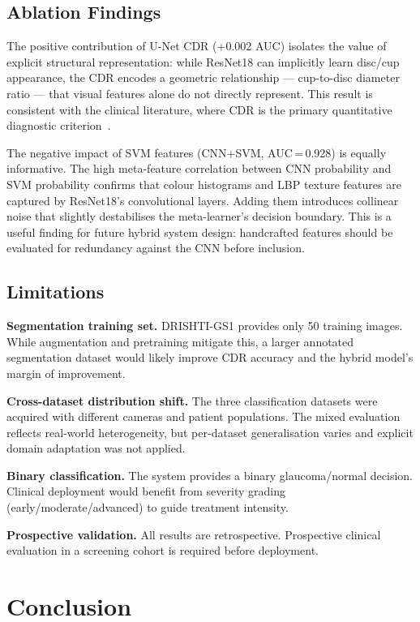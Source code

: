 \documentclass[conference]{IEEEtran}
\begin{document}
\subsection{Ablation Findings}
The positive contribution of U-Net CDR (+0.002 AUC) isolates the
value of explicit structural representation: while ResNet18 can
implicitly learn disc/cup appearance, the CDR encodes a geometric
relationship — cup-to-disc diameter ratio — that visual features
alone do not directly represent. This result is consistent with the
clinical literature, where CDR is the primary quantitative
diagnostic criterion~\cite{jonas1988}.
 
The negative impact of SVM features (CNN+SVM, AUC\,=\,0.928) is
equally informative. The high meta-feature correlation between CNN
probability and SVM probability confirms that colour histograms and
LBP texture features are captured by ResNet18's convolutional
layers. Adding them introduces collinear noise that slightly
destabilises the meta-learner's decision boundary. This is a useful
finding for future hybrid system design: handcrafted features should
be evaluated for redundancy against the CNN before inclusion.
 
\subsection{Limitations}
\textbf{Segmentation training set.} DRISHTI-GS1 provides only 50
training images. While augmentation and pretraining mitigate this,
a larger annotated segmentation dataset would likely improve CDR
accuracy and the hybrid model's margin of improvement.
 
\textbf{Cross-dataset distribution shift.} The three classification
datasets were acquired with different cameras and patient populations.
The mixed evaluation reflects real-world heterogeneity, but per-dataset
generalisation varies and explicit domain adaptation was not applied.
 
\textbf{Binary classification.} The system provides a binary
glaucoma/normal decision. Clinical deployment would benefit from
severity grading (early/moderate/advanced) to guide treatment
intensity.
 
\textbf{Prospective validation.} All results are retrospective.
Prospective clinical evaluation in a screening cohort is required
before deployment.
 
\section{Conclusion}
 
\end{document}
